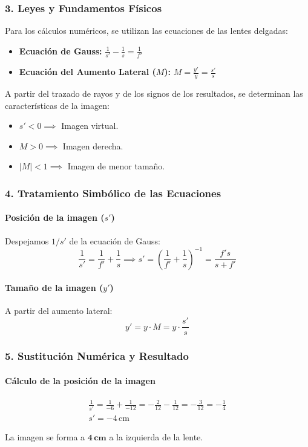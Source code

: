 \subsubsection*{3. Leyes y Fundamentos Físicos}
Para los cálculos numéricos, se utilizan las ecuaciones de las lentes delgadas:
\begin{itemize}
    \item \textbf{Ecuación de Gauss:} $\frac{1}{s'} - \frac{1}{s} = \frac{1}{f'}$
    \item \textbf{Ecuación del Aumento Lateral ($M$):} $M = \frac{y'}{y} = \frac{s'}{s}$
\end{itemize}
A partir del trazado de rayos y de los signos de los resultados, se determinan las características de la imagen:
\begin{itemize}
    \item $s' < 0 \implies$ Imagen virtual.
    \item $M > 0 \implies$ Imagen derecha.
    \item $|M| < 1 \implies$ Imagen de menor tamaño.
\end{itemize}

\subsubsection*{4. Tratamiento Simbólico de las Ecuaciones}
\paragraph{Posición de la imagen ($s'$)}
Despejamos $1/s'$ de la ecuación de Gauss:
$$ \frac{1}{s'} = \frac{1}{f'} + \frac{1}{s} \implies s' = \left(\frac{1}{f'} + \frac{1}{s}\right)^{-1} = \frac{f's}{s+f'} $$
\paragraph{Tamaño de la imagen ($y'$)}
A partir del aumento lateral:
$$ y' = y \cdot M = y \cdot \frac{s'}{s} $$

\subsubsection*{5. Sustitución Numérica y Resultado}
\paragraph{Cálculo de la posición de la imagen}
\begin{gather}
    \frac{1}{s'} = \frac{1}{-6} + \frac{1}{-12} = -\frac{2}{12} - \frac{1}{12} = -\frac{3}{12} = -\frac{1}{4} \\
    s' = -4 \, \text{cm}
\end{gather}
\begin{cajaresultado}
La imagen se forma a $\boldsymbol{4 \, \textbf{cm}}$ a la izquierda de la lente.
\end{cajaresultado}
